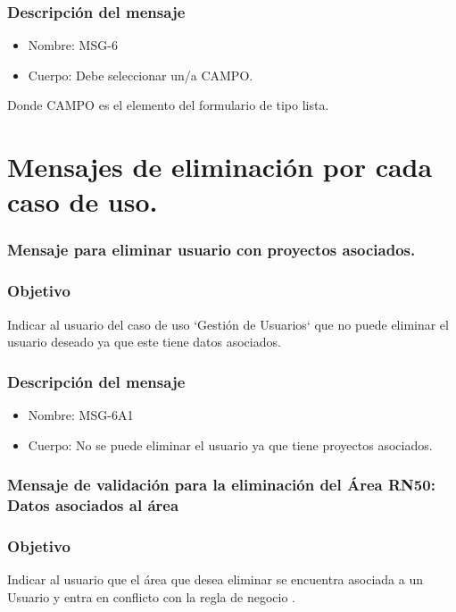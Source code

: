 \subsubsection{Descripción del mensaje}
\begin{itemize}
\item Nombre: MSG-6
\item Cuerpo: Debe seleccionar un/a CAMPO.

\end{itemize}
Donde CAMPO es el elemento del formulario de tipo lista.


\section{Mensajes de eliminación por cada caso de uso.}

\subsubsection{Mensaje para eliminar usuario con proyectos asociados.}\label{MSG-6A1}

\subsubsection{Objetivo}
Indicar al usuario del caso de uso `Gestión de Usuarios` que no puede eliminar el usuario deseado ya que este tiene datos asociados.

\subsubsection{Descripción del mensaje}
\begin{itemize}
\item Nombre: MSG-6A1
\item Cuerpo: No se puede eliminar el usuario ya que tiene proyectos asociados.
\end{itemize}


\subsubsection{Mensaje de validación para la eliminación del Área RN50: Datos asociados al área} \label{MSG-6A7}
 
 \subsubsection{Objetivo}
 Indicar al usuario que el área que desea eliminar se encuentra asociada a un Usuario y entra en conflicto con la regla de negocio .

